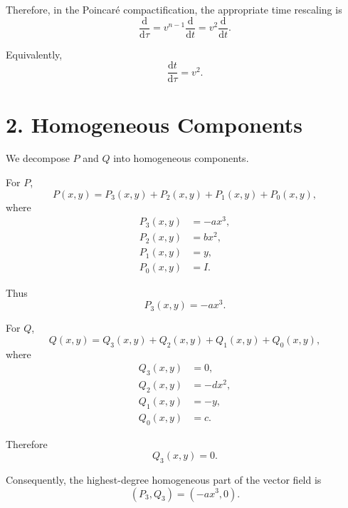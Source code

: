 \documentclass[11pt,a4paper]{article}
\newcommand{\dd}{\mathrm{d}}
\begin{document}
Therefore, in the Poincaré compactification, the appropriate
time rescaling is
\begin{equation}
\boxed{
\frac{\dd}{\dd\tau}
=
v^{n-1}\frac{\dd}{\dd t}
=
v^2\frac{\dd}{\dd t}.
}
\tag{2}
\end{equation}

Equivalently,
\begin{equation}
\boxed{
\frac{\dd t}{\dd\tau}=v^2.
}
\end{equation}

\section{2. Homogeneous Components}

We decompose $P$ and $Q$ into homogeneous components.

For $P$,
\begin{equation}
P(x,y)
=
P_3(x,y)+P_2(x,y)+P_1(x,y)+P_0(x,y),
\end{equation}
where
\begin{align}
P_3(x,y)&=-a x^3,\\
P_2(x,y)&=b x^2,\\
P_1(x,y)&=y,\\
P_0(x,y)&=I.
\end{align}

Thus
\begin{equation}
\boxed{
P_3(x,y)=-a x^3.
}
\tag{3}
\end{equation}

For $Q$,
\begin{equation}
Q(x,y)
=
Q_3(x,y)+Q_2(x,y)+Q_1(x,y)+Q_0(x,y),
\end{equation}
where
\begin{align}
Q_3(x,y)&=0,\\
Q_2(x,y)&=-d x^2,\\
Q_1(x,y)&=-y,\\
Q_0(x,y)&=c.
\end{align}

Therefore
\begin{equation}
\boxed{
Q_3(x,y)=0.
}
\tag{4}
\end{equation}

Consequently, the highest-degree homogeneous part of the vector field is
\begin{equation}
\boxed{
(P_3,Q_3)
=
\left(-a x^3,0\right).
}
\tag{5}
\end{equation}
\end{document}
